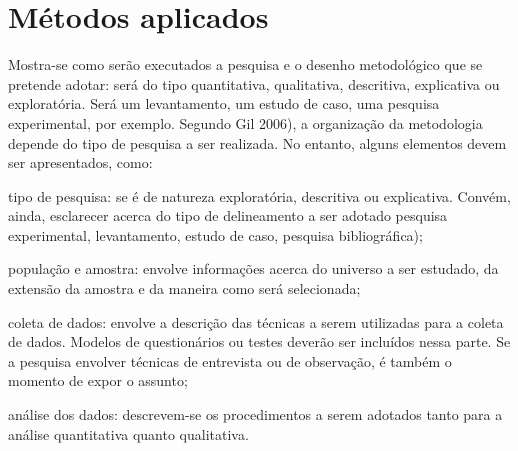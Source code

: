 \chapter{Métodos aplicados}

	Mostra-se como serão executados a pesquisa e o desenho metodológico que se pretende adotar: será do tipo quantitativa, qualitativa, descritiva, explicativa ou exploratória. Será um levantamento, um estudo de caso, uma pesquisa experimental, por exemplo. Segundo Gil 2006), a organização da metodologia depende do tipo de pesquisa a ser realizada. No entanto, alguns elementos devem ser apresentados, como:
	
	\begin{alineas}
	\item tipo de pesquisa: se é de natureza exploratória, descritiva ou explicativa.
	Convém, ainda, esclarecer acerca do tipo de delineamento a ser adotado pesquisa experimental, levantamento, estudo de caso, pesquisa bibliográfica);
	
	\item  população e amostra: envolve informações acerca do universo a ser estudado, da extensão da amostra e da maneira como será selecionada;
	\item coleta de dados: envolve a descrição das técnicas a serem utilizadas para a coleta de dados. Modelos de questionários ou testes deverão ser incluídos nessa parte. Se a pesquisa envolver técnicas de entrevista ou de observação, é também o momento de expor o assunto;
	\item análise dos dados: descrevem-se os procedimentos a serem adotados tanto
	para a análise quantitativa quanto qualitativa.
	\end{alineas}